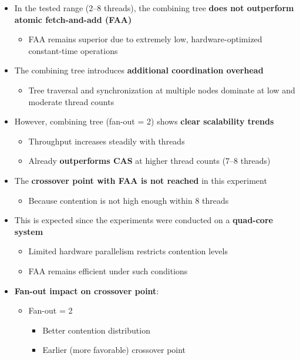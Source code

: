 \documentclass[11pt,a4paper]{article}
\begin{document}
\begin{itemize}
    \item In the tested range (2--8 threads), the combining tree \textbf{does not outperform atomic fetch-and-add (FAA)}
    \begin{itemize}
        \item FAA remains superior due to extremely low, hardware-optimized constant-time operations
    \end{itemize}

    \item The combining tree introduces \textbf{additional coordination overhead}
    \begin{itemize}
        \item Tree traversal and synchronization at multiple nodes dominate at low and moderate thread counts
    \end{itemize}

    \item However, combining tree (fan-out = 2) shows \textbf{clear scalability trends}
    \begin{itemize}
        \item Throughput increases steadily with threads
        \item Already \textbf{outperforms CAS} at higher thread counts (7--8 threads)
    \end{itemize}

    \item The \textbf{crossover point with FAA is not reached} in this experiment
    \begin{itemize}
        \item Because contention is not high enough within 8 threads
    \end{itemize}

    \item This is expected since the experiments were conducted on a \textbf{quad-core system}
    \begin{itemize}
        \item Limited hardware parallelism restricts contention levels
        \item FAA remains efficient under such conditions
    \end{itemize}

    \item \textbf{Fan-out impact on crossover point}:
    \begin{itemize}
        \item Fan-out = 2
        \begin{itemize}
            \item Better contention distribution
            \item Earlier (more favorable) crossover point
        \end{itemize}


\end{itemize}
\end{itemize}
\end{document}
